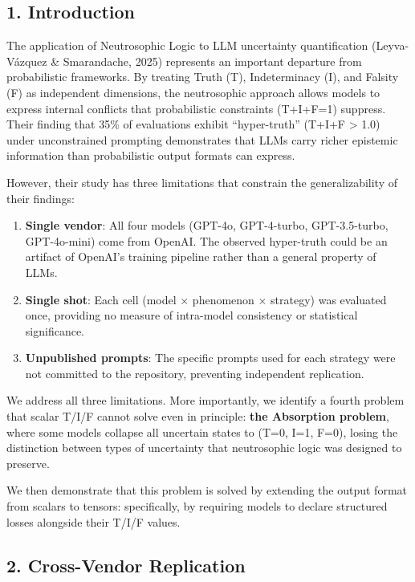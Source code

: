 \documentclass[
]{article}
\begin{document}
\hypertarget{introduction}{%
\subsection{1. Introduction}\label{introduction}}

The application of Neutrosophic Logic to LLM uncertainty quantification
(Leyva-Vázquez \& Smarandache, 2025) represents an important departure
from probabilistic frameworks. By treating Truth (T), Indeterminacy (I),
and Falsity (F) as independent dimensions, the neutrosophic approach
allows models to express internal conflicts that probabilistic
constraints (T+I+F=1) suppress. Their finding that 35\% of evaluations
exhibit ``hyper-truth'' (T+I+F \textgreater{} 1.0) under unconstrained
prompting demonstrates that LLMs carry richer epistemic information than
probabilistic output formats can express.

However, their study has three limitations that constrain the
generalizability of their findings:

\begin{enumerate}
\def\labelenumi{\arabic{enumi}.}
\item
  \textbf{Single vendor}: All four models (GPT-4o, GPT-4-turbo,
  GPT-3.5-turbo, GPT-4o-mini) come from OpenAI. The observed hyper-truth
  could be an artifact of OpenAI's training pipeline rather than a
  general property of LLMs.
\item
  \textbf{Single shot}: Each cell (model × phenomenon × strategy) was
  evaluated once, providing no measure of intra-model consistency or
  statistical significance.
\item
  \textbf{Unpublished prompts}: The specific prompts used for each
  strategy were not committed to the repository, preventing independent
  replication.
\end{enumerate}

We address all three limitations. More importantly, we identify a fourth
problem that scalar T/I/F cannot solve even in principle: \textbf{the
Absorption problem}, where some models collapse all uncertain states to
(T=0, I=1, F=0), losing the distinction between types of uncertainty
that neutrosophic logic was designed to preserve.

We then demonstrate that this problem is solved by extending the output
format from scalars to tensors: specifically, by requiring models to
declare structured losses alongside their T/I/F values.

\hypertarget{cross-vendor-replication}{%
\subsection{2. Cross-Vendor
Replication}\label{cross-vendor-replication}}
\end{document}
